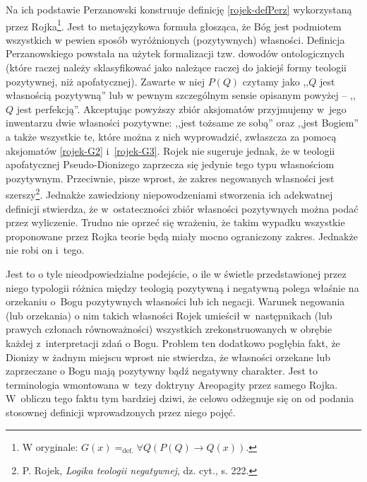 Na ich podstawie Perzanowski konstruuje definicję \eqref{rojek-defPerz} wykorzystaną przez Rojka\footnote{W oryginale:
$G(x) =_{\text{def.}} \forall Q (P(Q) \to Q(x))$.
}. Jest to metajęzykowa formuła głosząca, że Bóg jest podmiotem
wszystkich w pewien sposób wyróżnionych (pozytywnych) własności. Definicja Perzanowskiego powstała na użytek
formalizacji tzw. dowodów ontologicznych (które raczej należy sklasyfikować jako należące raczej do jakiejś
formy teologii pozytywnej, niż apofatycznej). Zawarte w niej $P(Q)$ czytamy jako ,,$Q$ jest
własnością pozytywną'' lub w pewnym szczególnym sensie opisanym powyżej -- ,,$Q$
jest perfekcją''. Akceptując powyższy zbiór aksjomatów przyjmujemy w~jego inwentarzu dwie własności pozytywne:
,,jest tożsame ze sobą'' oraz ,,jest Bogiem'' a także wszystkie te, które można z nich 
wyprowadzić, zwłaszcza za pomocą aksjomatów \eqref{rojek-G2} i~\eqref{rojek-G3}.
Rojek nie sugeruje jednak, że w teologii apofatycznej
Pseudo-Dionizego zaprzecza się jedynie tego typu własnościom
pozytywnym. Przeciwnie, pisze wprost, że zakres negowanych własności
jest szerszy\footnote{P. Rojek, \textit{Logika teologii negatywnej}, dz. cyt., s. 222. }. 
Jednakże zawiedziony niepowodzeniami
stworzenia ich adekwatnej definicji stwierdza, że
w~ostateczności zbiór własności
pozytywnych można podać przez wyliczenie. Trudno nie oprzeć się wrażeniu, że takim wypadku
wszystkie proponowane przez Rojka teorie będą miały mocno ograniczony
zakres. Jednakże nie robi on i~tego.










Jest
to o tyle  nieodpowiedzialne podejście, o ile w świetle przedstawionej przez niego typologii
różnica między teologią pozytywną i negatywną polega właśnie na orzekaniu o~Bogu pozytywnych własności lub ich negacji. Warunek negowania (lub orzekania) o nim takich własności Rojek umieścił w~następnikach (lub prawych członach równoważności) wszystkich zrekonstruowanych w obrębie każdej z~interpretacji zdań o Bogu.
Problem ten dodatkowo pogłębia fakt, że Dionizy w żadnym miejscu wprost
nie stwierdza, że własności orzekane lub zaprzeczane o Bogu mają
pozytywny bądź negatywny charakter. Jest to terminologia wmontowana w~tezy doktryny Areopagity przez samego Rojka.
W~obliczu tego faktu tym
bardziej dziwi, że celowo odżegnuje się on od podania stosownej
definicji wprowadzonych przez niego pojęć.



